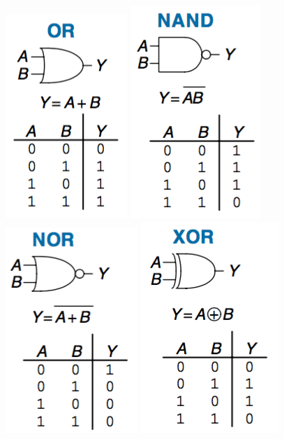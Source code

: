 \documentclass[12pt]{article}
\theoremstyle{definition}
\begin{document}
  \includegraphics[scale=0.9]{pictures/orGate.png}
  \includegraphics[scale=0.9]{pictures/nandGate.png}
  \includegraphics[scale=0.9]{pictures/norGate.png}
  \includegraphics[scale=0.9]{pictures/xorGate.png}
\end{document}
